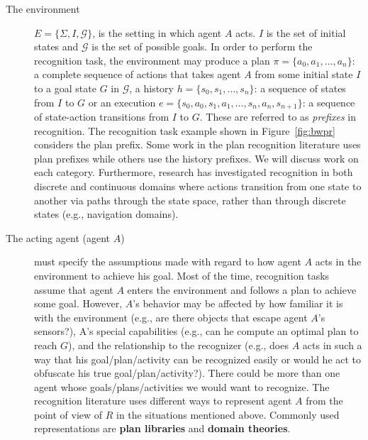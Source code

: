\begin{description}
\item [The environment] $E = \lbrace \Sigma, I, \mathcal{G}\rbrace$, is the setting in which agent $A$ acts. $I$ is the set of initial states and $\mathcal{G}$ is the set of possible goals. In order to perform the recognition task, the environment may produce a plan $\pi=\lbrace a_0, a_1, \ldots, a_n\rbrace$: a complete sequence of actions that takes agent $A$ from some initial state $I$ to a goal state $G$ in $\mathcal{G}$, a history $h=\lbrace s_0, s_1, \ldots, s_n\rbrace$: a sequence of states from $I$ to $G$ or an execution $e=\lbrace s_0, a_0, s_1, a_1, \ldots, s_n, a_n, s_{n+1}\rbrace$: a sequence of state-action transitions from $I$ to $G$. These are referred to as \textit{prefixes} in recognition. The recognition task example shown in Figure~\ref{fig:bwpr} considers the plan prefix. Some work in the plan recognition literature uses plan prefixes while others use the history prefixes. We will discuss work on each category. Furthermore, research has investigated recognition in both discrete and continuous domains where actions transition from one state to another via paths through the state space, rather than through discrete states (e.g., navigation domains).

\item [The acting agent (agent $A$)] must specify the assumptions made with regard to how agent $A$ acts in the environment to achieve his goal. Most of the time, recognition tasks assume that agent $A$ enters the environment and follows a plan to achieve some goal. However, $A$'s behavior may be affected by how familiar it is with the environment (e.g., are there objects that escape agent $A$'s sensors?), A's special capabilities (e.g., can he compute an optimal plan to reach $G$), and the relationship to the recognizer (e.g., does $A$ acts in such a way that his goal/plan/activity can be recognized easily or would he act to obfuscate his true goal/plan/activity?). There could be more than one agent whose goals/plans/activities we would want to recognize.
The recognition literature uses different ways to represent agent $A$ from the point of view of $R$ in the situations mentioned above. Commonly used representations are \textbf{plan libraries} and \textbf{domain theories}.


\end{description}
